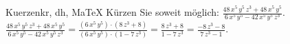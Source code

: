 \begin{MAufgabe}{Kuerzen}{kr, dh, MaTeX}
K\"urzen Sie soweit m\"oglich: $\frac{48\, x^5\, y^5\, z^3 + 48\, x^5\, y^5}{6\, x^5\, y^5 - 42\, x^5\, y^5\, z^3}$.\\ 
\ifLsg\MLoesung
\quad $\frac{48\, x^5\, y^5\, z^3 + 48\, x^5\, y^5}{6\, x^5\, y^5 - 42\, x^5\, y^5\, z^3}=\frac{(6\, x^5\, y^5)\cdot(8\, z^3 + 8)}{(6\, x^5\, y^5)\cdot(1 - 7\, z^3)}=\frac{8\, z^3 + 8}{1 - 7\, z^3}=\frac{ - 8\, z^3 - 8}{7\, z^3 - 1}$.\else\relax\fi
 \end{MAufgabe}